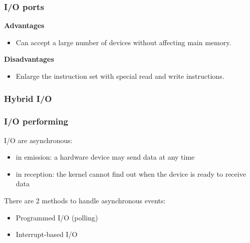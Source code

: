 %
%
%

\begin{frame}
  \frametitle{I/O ports}

  \begin{center}
  \end{center}

  {\bf Advantages}\\
  \begin{itemize}
    \item Can accept a large number of devices without affecting main memory.
  \end{itemize}

  {\bf Disadvantages}\\
  \begin{itemize}
    \item Enlarge the instruction set with special read and write instructions.
  \end{itemize}

\end{frame}

%
%
%

\begin{frame}
  \frametitle{Hybrid I/O}

  \begin{center}
  \end{center}

\end{frame}

%
%
%

\begin{frame}
  \frametitle{I/O performing}

  I/O are asynchronous:

  \begin{itemize}
    \item in emission: a hardware device may send data at any time
    \item in reception: the kernel cannot find out when the device is ready to
      receive data
  \end{itemize}

  \-

  There are 2 methods to handle asynchronous events:

  \begin{itemize}
    \item Programmed I/O (polling)
    \item Interrupt-based I/O
  \end{itemize}

\end{frame}

